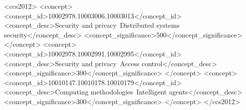 \documentclass[sigconf]{acmart}
\begin{document}
\begin{CCSXML}
<ccs2012>
   <concept>
       <concept_id>10002978.10003006.10003013</concept_id>
       <concept_desc>Security and privacy~Distributed systems security</concept_desc>
       <concept_significance>500</concept_significance>
       </concept>
   <concept>
       <concept_id>10002978.10002991.10002995</concept_id>
       <concept_desc>Security and privacy~Access control</concept_desc>
       <concept_significance>300</concept_significance>
       </concept>
   <concept>
       <concept_id>10010147.10010178.10010179</concept_id>
       <concept_desc>Computing methodologies~Intelligent agents</concept_desc>
       <concept_significance>300</concept_significance>
       </concept>
 </ccs2012>
\end{CCSXML}



\maketitle

%
%
%
%
\end{document}
